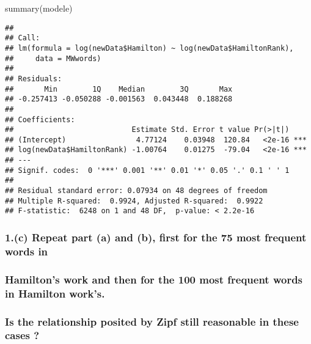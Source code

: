 \documentclass[
]{article}
\newenvironment{Shaded}{\begin{snugshade}}{\end{snugshade}}
\newcommand{\AttributeTok}[1]{\textcolor[rgb]{0.77,0.63,0.00}{#1}}
\newcommand{\DecValTok}[1]{\textcolor[rgb]{0.00,0.00,0.81}{#1}}
\newcommand{\FunctionTok}[1]{\textcolor[rgb]{0.00,0.00,0.00}{#1}}
\newcommand{\NormalTok}[1]{#1}
\newcommand{\OtherTok}[1]{\textcolor[rgb]{0.56,0.35,0.01}{#1}}
\newcommand{\SpecialCharTok}[1]{\textcolor[rgb]{0.00,0.00,0.00}{#1}}
\begin{document}
\begin{Shaded}
\begin{Highlighting}[]
\FunctionTok{summary}\NormalTok{(modele)}
\end{Highlighting}
\end{Shaded}

\begin{verbatim}
## 
## Call:
## lm(formula = log(newData$Hamilton) ~ log(newData$HamiltonRank), 
##     data = MWwords)
## 
## Residuals:
##       Min        1Q    Median        3Q       Max 
## -0.257413 -0.050288 -0.001563  0.043448  0.188268 
## 
## Coefficients:
##                           Estimate Std. Error t value Pr(>|t|)    
## (Intercept)                4.77124    0.03948  120.84   <2e-16 ***
## log(newData$HamiltonRank) -1.00764    0.01275  -79.04   <2e-16 ***
## ---
## Signif. codes:  0 '***' 0.001 '**' 0.01 '*' 0.05 '.' 0.1 ' ' 1
## 
## Residual standard error: 0.07934 on 48 degrees of freedom
## Multiple R-squared:  0.9924, Adjusted R-squared:  0.9922 
## F-statistic:  6248 on 1 and 48 DF,  p-value: < 2.2e-16
\end{verbatim}

\hypertarget{c-repeat-part-a-and-b-first-for-the-75-most-frequent-words-in}{%
\subsubsection{1.(c) Repeat part (a) and (b), first for the 75 most
frequent words
in}\label{c-repeat-part-a-and-b-first-for-the-75-most-frequent-words-in}}

\hypertarget{hamiltons-work-and-then-for-the-100-most-frequent-words-in-hamilton-works.}{%
\subsubsection{Hamilton's work and then for the 100 most frequent words
in Hamilton
work's.}\label{hamiltons-work-and-then-for-the-100-most-frequent-words-in-hamilton-works.}}

\hypertarget{is-the-relationship-posited-by-zipf-still-reasonable-in-these-cases}{%
\subsubsection{Is the relationship posited by Zipf still reasonable in
these cases
?}\label{is-the-relationship-posited-by-zipf-still-reasonable-in-these-cases}}

\begin{Shaded}
\end{Shaded}
\end{document}
